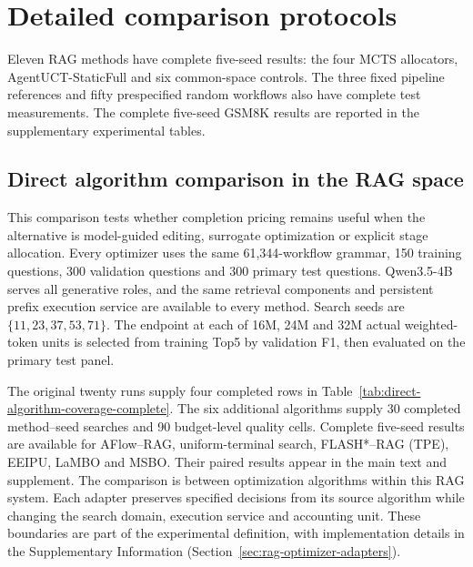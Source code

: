 \section{Detailed comparison protocols}
\label{sec:followup-design}
Eleven RAG methods have complete five-seed results: the four MCTS
allocators, AgentUCT-StaticFull and six common-space controls.
The three fixed pipeline references and fifty prespecified random workflows
also have complete test measurements. The complete five-seed GSM8K results are reported in the supplementary
experimental tables.

\subsection{Direct algorithm comparison in the RAG space}
\label{sec:rag-comparators}
This comparison tests whether completion pricing remains useful when the
alternative is model-guided editing, surrogate optimization or explicit
stage allocation. Every optimizer uses the same 61,344-workflow grammar,
150 training questions, 300 validation questions and 300 primary test
questions. Qwen3.5-4B serves all generative roles, and the same retrieval
components and persistent prefix execution service are available to every
method. Search seeds are $\{11,23,37,53,71\}$. The endpoint at each of
16M, 24M and 32M actual weighted-token units is selected from training Top5
by validation F1, then evaluated on the primary test panel.

The original twenty runs supply four completed rows in
Table~\ref{tab:direct-algorithm-coverage-complete}. The six additional algorithms
supply 30 completed method--seed searches and 90 budget-level quality cells.
Complete five-seed results are available for AFlow--RAG, uniform-terminal
search, FLASH*--RAG (TPE), EEIPU, LaMBO and MSBO. Their paired results
appear in the main text and supplement. The comparison is between optimization
algorithms within this RAG system. Each adapter preserves specified decisions
from its source algorithm while changing the search domain, execution service
and accounting unit. These boundaries are part of the experimental definition,
with implementation details in the Supplementary Information\ifdefined\AgentUCTWithAppendix
(Section~\ref{sec:rag-optimizer-adapters})\fi.

